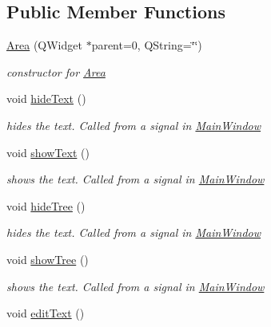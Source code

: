 \subsection*{Public Member Functions}
\begin{DoxyCompactItemize}
\item 
\hyperlink{classArea_a6b4b4faf9f541b9071af669c59b49dd9}{Area} (Q\+Widget $\ast$parent=0, Q\+String=\char`\"{}\char`\"{})
\begin{DoxyCompactList}\small\item\em constructor for \hyperlink{classArea}{Area} \end{DoxyCompactList}\item 
\hypertarget{classArea_a93e6b5cec522625ca0ad121fb60c9319}{void \hyperlink{classArea_a93e6b5cec522625ca0ad121fb60c9319}{hide\+Text} ()}\label{classArea_a93e6b5cec522625ca0ad121fb60c9319}

\begin{DoxyCompactList}\small\item\em hides the text. Called from a signal in \hyperlink{classMainWindow}{Main\+Window} \end{DoxyCompactList}\item 
\hypertarget{classArea_a8d4dedd9261bd7299801221b71f6405e}{void \hyperlink{classArea_a8d4dedd9261bd7299801221b71f6405e}{show\+Text} ()}\label{classArea_a8d4dedd9261bd7299801221b71f6405e}

\begin{DoxyCompactList}\small\item\em shows the text. Called from a signal in \hyperlink{classMainWindow}{Main\+Window} \end{DoxyCompactList}\item 
\hypertarget{classArea_ad2d39f0bdbe63a3df0e93baab91139a2}{void \hyperlink{classArea_ad2d39f0bdbe63a3df0e93baab91139a2}{hide\+Tree} ()}\label{classArea_ad2d39f0bdbe63a3df0e93baab91139a2}

\begin{DoxyCompactList}\small\item\em hides the text. Called from a signal in \hyperlink{classMainWindow}{Main\+Window} \end{DoxyCompactList}\item 
\hypertarget{classArea_a536387c9433a7587d4dd23afc3ec2ebd}{void \hyperlink{classArea_a536387c9433a7587d4dd23afc3ec2ebd}{show\+Tree} ()}\label{classArea_a536387c9433a7587d4dd23afc3ec2ebd}

\begin{DoxyCompactList}\small\item\em shows the text. Called from a signal in \hyperlink{classMainWindow}{Main\+Window} \end{DoxyCompactList}\item 
\hypertarget{classArea_a101856bd6a6716144d468130db4a34d6}{void \hyperlink{classArea_a101856bd6a6716144d468130db4a34d6}{edit\+Text} ()}\label{classArea_a101856bd6a6716144d468130db4a34d6}


\end{DoxyCompactItemize}

